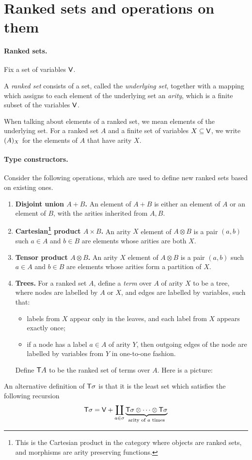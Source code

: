 
\section{Ranked sets and operations on them}
\paragraph*{Ranked sets.}
Fix a set of variables $\mathsf V$.
\begin{definition}
    A \emph{ranked set} consists of a set, called the \emph{underlying set}, together with a mapping  which assigns to each element of the underlying set an \emph{arity}, which is a finite subset of the variables $\mathsf V$. 
\end{definition}
When talking about elements of a ranked set, we mean elements of the underlying set.   For a ranked set $A$ and a finite set of variables $X \subseteq \mathsf V$, we write $(A)_{X}$ for the elements of $A$ that have arity $X$. 

\paragraph*{Type constructors.}
Consider the following operations, which are used to define new ranked sets based on existing ones.
\begin{enumerate}
    \item {\bf Disjoint union $A+B$.} An element of $A+B$ is either an element of $A$ or an element of $B$, with the arities inherited from $A,B$. 
    \item {\bf Cartesian\footnote{This is the Cartesian product in the category where objects are ranked sets, and morphisms are arity preserving functions.}  product $A \times B$.} An arity $X$ element of $A \otimes B$ is a pair $(a,b)$ such $a \in A$ and $b \in B$ are elements whose arities are both $X$.
    \item {\bf Tensor product $A \otimes B$.} An arity $X$ element of $A \otimes B$ is a pair $(a,b)$ such $a \in A$ and $b \in B$ are elements whose arities form a partition of $X$. 
    \item {\bf Trees.} For a ranked set  $A$, define a \emph{term} over $A$ of arity $X$ to be a tree, where nodes are labelled by  $A$ or $X$, and edges are labelled by  variables, such that:
    \begin{itemize}
        \item labels from $X$ appear only in the leaves, and each label from $X$ appears exactly once;
        \item if a node has a label $a \in A$ of arity $Y$, then outgoing edges of the node are labelled by variables from $Y$ in one-to-one fashion. 
    \end{itemize}
    Define $\mathsf T A$ to be the ranked set of terms over $A$. Here is a picture: 
\end{enumerate}    

An alternative definition of $\mathsf T \sigma$ is that it is the least set which satisfies the following recursion
\begin{align*}
    \mathsf T \sigma = \mathsf V + \coprod_{a \in \sigma} \underbrace{\mathsf T \sigma \otimes \cdots \otimes \mathsf T \sigma}_{\text{arity of $a$ times}}
\end{align*}